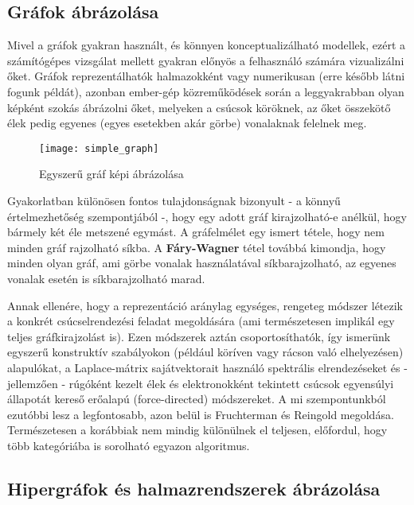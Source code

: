 \subsection{Gráfok ábrázolása} \label{graphLayout}

Mivel a gráfok gyakran használt, és könnyen konceptualizálható modellek, ezért a számítógépes vizsgálat mellett gyakran előnyös a felhasználó számára vizualizálni őket. Gráfok reprezentálhatók halmazokként vagy numerikusan (erre később látni fogunk példát), azonban ember-gép közreműködések során a leggyakrabban olyan képként szokás ábrázolni őket, melyeken a csúcsok köröknek, az őket összekötő élek pedig egyenes (egyes esetekben akár görbe) vonalaknak felelnek meg.

\begin{figure}[H]
	\centering
	\texttt{[image: simple\_graph]}
	\caption{Egyszerű gráf képi ábrázolása}
\end{figure}

Gyakorlatban különösen fontos tulajdonságnak bizonyult - a könnyű értelmezhetőség szempontjából -, hogy egy adott gráf kirajzolható-e anélkül, hogy bármely két éle metszené egymást. A gráfelmélet egy ismert tétele, hogy nem minden gráf rajzolható síkba. A \textbf{Fáry-Wagner} tétel továbbá kimondja, hogy minden olyan gráf, ami görbe vonalak használatával síkbarajzolható, az egyenes vonalak esetén is síkbarajzolható marad.

Annak ellenére, hogy a reprezentáció aránylag egységes, rengeteg módszer létezik a konkrét csúcselrendezési feladat megoldására (ami természetesen implikál egy teljes gráfkirajzolást is). Ezen módszerek aztán csoportosíthatók, így ismerünk egyszerű konstruktív szabályokon (például köríven vagy rácson való elhelyezésen) alapulókat\cite{graph_layout_circular, graph_layout_circular2, graph_layout_orthogonal}, a Laplace-mátrix sajátvektorait használó spektrális elrendezéseket\cite{graph_layout_spectral} és - jellemzően - rúgóként kezelt élek és elektronokként tekintett csúcsok egyensúlyi állapotát kereső erőalapú (force-directed) módszereket\cite{graph_layout_force_directed, graph_layout_force_directed2}. A mi szempontunkból ezutóbbi lesz a legfontosabb, azon belül is Fruchterman és Reingold megoldása\cite{graph_layout_fruchterman}. Természetesen a korábbiak nem mindig különülnek el teljesen, előfordul, hogy több kategóriába is sorolható egyazon algoritmus\cite{graph_layout_hybrid}.

\subsection{Hipergráfok és halmazrendszerek ábrázolása}

